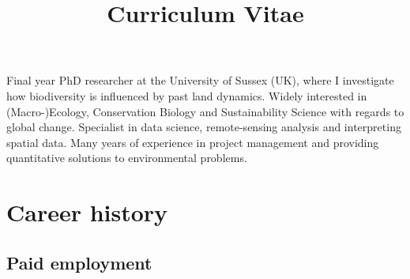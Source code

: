 \documentclass[12pt,a4paper,serif]{moderncv}        %
\title{Curriculum Vitae}                               %
\begin{document}
\makecvtitle

\small{Final year PhD researcher at the University of Sussex (UK), where I investigate how biodiversity is influenced by past land dynamics. Widely interested in (Macro-)Ecology, Conservation Biology and Sustainability Science with regards to global change. Specialist in data science, remote-sensing analysis and interpreting spatial data. Many years of experience in project management and providing quantitative solutions to environmental problems.}

\section{Career history}
\subsection{Paid employment}
\vspace{4pt}
\end{document}

